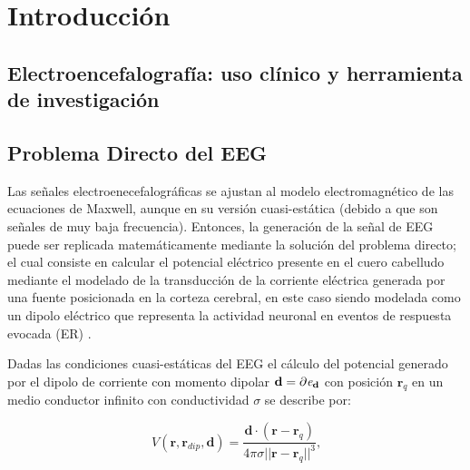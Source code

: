 %
\chapter{Introducción}
\label{sec:intro}




\section{Electroencefalografía: uso clínico y herramienta de investigación}

\section{Problema Directo del EEG}
\label{sec:methodology:direct}

Las señales electroenecefalográficas se ajustan al modelo electromagnético de las ecuaciones de Maxwell, aunque en su versión cuasi-estática
(debido a que son señales de muy baja frecuencia). Entonces, la generación de la señal de EEG puede ser replicada matemáticamente mediante la
solución del problema directo; el cual consiste en calcular el potencial eléctrico presente en el cuero cabelludo mediante el modelado de la transducción de la corriente eléctrica generada por una fuente posicionada en la corteza cerebral, en este caso siendo modelada como un dipolo eléctrico que representa la actividad neuronal en eventos de respuesta evocada (ER) \cite{Mosher1999, Hallez2007}. 

Dadas las condiciones cuasi-estáticas del EEG \cite{Plonsey1967} el cálculo del potencial generado por el dipolo de corriente con momento dipolar $ \mathbf{d} = \partial\emph{e}_{\mathbf{d}}$ con posición $\mathbf{r}_{q}$ en un medio conductor infinito con conductividad $\sigma$ se describe por:

\begin{equation}
	\label{fdip}
	V(\mathbf{r},\mathbf{r}_{dip},\mathbf{d})=\frac{\mathbf{d}\cdot(\mathbf{r}-\mathbf{r}_{q})}{4\pi \sigma {||\mathbf{r}-\mathbf{r}_{q}||}^{3}}\text{,}
\end{equation}

